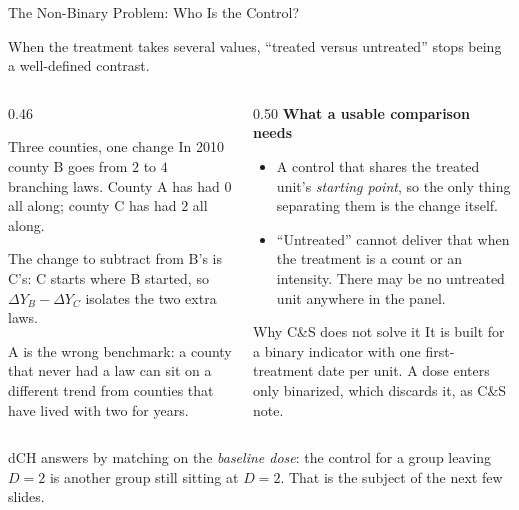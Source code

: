 \documentclass[main.tex]{subfiles}
\begin{document}
\begin{frame}{The Non-Binary Problem: Who Is the Control?}

  When the treatment takes several values, ``treated versus untreated'' stops
  being a well-defined contrast.

  \medskip
  \begin{columns}[T]
    \begin{column}{0.46\textwidth}
      \begin{block}{Three counties, one change}
        \footnotesize
        In 2010 county B goes from $2$ to $4$ branching laws. County A has had
        $0$ all along; county C has had $2$ all along.

        \smallskip
        The change to subtract from B's is C's: C starts where B started, so
        $\Delta Y_B - \Delta Y_C$ isolates the two extra laws.

        \smallskip
        A is the wrong benchmark: a county that never had a law can sit on a
        different trend from counties that have lived with two for years.
      \end{block}
    \end{column}
    \begin{column}{0.50\textwidth}
      \textbf{What a usable comparison needs}
      \begin{itemize}\footnotesize
        \item A control that shares the treated unit's \emph{starting point},
          so the only thing separating them is the change itself.
        \item ``Untreated'' cannot deliver that when the treatment is a count
          or an intensity. There may be no untreated unit anywhere in the panel.
      \end{itemize}

      \smallskip
      \begin{exampleblock}{\footnotesize Why C\&S does not solve it}
        \footnotesize
        It is built for a binary indicator with one first-treatment date per
        unit. A dose enters only binarized, which discards it, as C\&S
        note.
      \end{exampleblock}
    \end{column}
  \end{columns}

  \medskip
  \footnotesize dCH answers by matching on the \emph{baseline dose}: the control
  for a group leaving $D=2$ is another group still sitting at $D=2$. That is the
  subject of the next few slides.

\end{frame}
\end{document}
